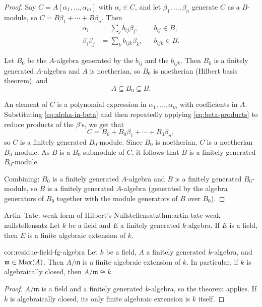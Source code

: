 \begin{proof}
Say $C = A[\alpha_1, \ldots, \alpha_m]$ with $\alpha_i \in C$, and let $\beta_1, \ldots, \beta_n$ generate $C$ as a $B$-module, so $C = B\beta_1 + \cdots + B\beta_n$. Then
\begin{align}
\alpha_i &= \sum_j b_{ij}\beta_j, && b_{ij} \in B, \label{eq:alpha-in-beta}\\
\beta_i\beta_j &= \sum_k b_{ijk}\beta_k, && b_{ijk} \in B. \label{eq:beta-products}
\end{align}

Let $B_0$ be the $A$-algebra generated by the $b_{ij}$ and the $b_{ijk}$. Then $B_0$ is a finitely generated $A$-algebra and $A$ is noetherian, so $B_0$ is noetherian (Hilbert basis theorem), and
\[
A \subseteq B_0 \subseteq B.
\]

An element of $C$ is a polynomial expression in $\alpha_1, \ldots, \alpha_m$ with coefficients in $A$. Substituting \eqref{eq:alpha-in-beta} and then repeatedly applying \eqref{eq:beta-products} to reduce products of the $\beta$'s, we get that
\[
C = B_0 + B_0\beta_1 + \cdots + B_0\beta_n,
\]
so $C$ is a finitely generated $B_0$-module. Since $B_0$ is noetherian, $C$ is a noetherian $B_0$-module. As $B$ is a $B_0$-submodule of $C$, it follows that $B$ is a finitely generated $B_0$-module.

Combining: $B_0$ is a finitely generated $A$-algebra and $B$ is a finitely generated $B_0$-module, so $B$ is a finitely generated $A$-algebra (generated by the algebra generators of $B_0$ together with the module generators of $B$ over $B_0$).
\end{proof}

\begin{theorem}{Artin--Tate: weak form of Hilbert's Nullstellensatz}{thm:artin-tate-weak-nullstellensatz}
Let $k$ be a field and $E$ a finitely generated $k$-algebra. If $E$ is a field, then $E$ is a finite algebraic extension of $k$.
\end{theorem}

\begin{corollary}{}{cor:residue-field-fg-algebra}
Let $k$ be a field, $A$ a finitely generated $k$-algebra, and $\mathfrak m \in \operatorname{Max}(A)$. Then $A/\mathfrak m$ is a finite algebraic extension of $k$. In particular, if $k$ is algebraically closed, then $A/\mathfrak m \cong k$.
\end{corollary}

\begin{proof}
$A/\mathfrak m$ is a field and a finitely generated $k$-algebra, so the theorem applies. If $k$ is algebraically closed, its only finite algebraic extension is $k$ itself.
\end{proof}

